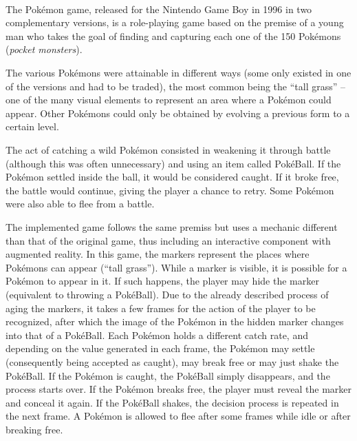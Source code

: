 \label{sec:game}

The Pokémon\textsuperscript{\textregistered} game, released for the Nintendo\textsuperscript{\textregistered} Game Boy\textsuperscript{\textregistered} in 1996 in two complementary versions, is a role-playing game based on the premise of a young man who takes the goal of finding and capturing each one of the 150 Pokémons (\textit{pocket monsters}).

The various Pokémons were attainable in different ways (some only existed in one of the versions and had to be traded), the most common being the ``tall grass'' -- one of the many visual elements to represent an area where a Pokémon could appear. Other Pokémons could only be obtained by evolving a previous form to a certain level.

The act of catching a wild Pokémon consisted in weakening it through battle (although this was often unnecessary) and using an item called PokéBall. If the Pokémon settled inside the ball, it would be considered caught. If it broke free, the battle would continue, giving the player a chance to retry. Some Pokémon were also able to flee from a battle.

The implemented game follows the same premiss but uses a mechanic different than that of the original game, thus including an interactive component with augmented reality. In this game, the markers represent the places where Pokémons can appear (``tall grass''). While a marker is visible, it is possible for a Pokémon to appear in it. If such happens, the player may hide the marker (equivalent to throwing a PokéBall). Due to the already described process of aging the markers, it takes a few frames for the action of the player to be recognized, after which the image of the Pokémon in the hidden marker changes into that of a PokéBall. Each Pokémon holds a different catch rate, and depending on the value generated in each frame, the Pokémon may settle (consequently being accepted as caught), may break free or may just shake the PokéBall. If the Pokémon is caught, the PokéBall simply disappears, and the process starts over. If the Pokémon breaks free, the player must reveal the marker and conceal it again. If the PokéBall shakes, the decision process is repeated in the next frame. A Pokémon is allowed to flee after some frames while idle or after breaking free.

